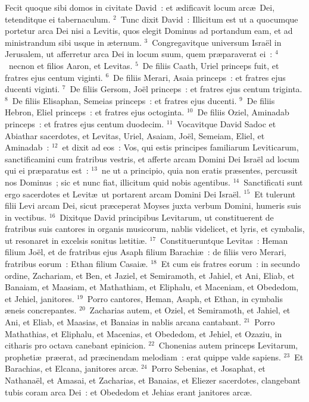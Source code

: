 \bchapter
\lettrine[lines=3,image=true,loversize=0.05,lraise=-0.03]{F}{}ecit quoque sibi domos in civitate David~: et \ae dificavit locum arc\ae\ Dei, tetenditque ei tabernaculum.
${}^{2}$~Tunc dixit David~: Illicitum est ut a quocumque portetur arca Dei nisi a Levitis, quos elegit Dominus ad portandum eam, et ad ministrandum sibi usque in \ae ternum.
${}^{3}$~Congregavitque universum Isra\"el in Jerusalem, ut afferretur arca Dei in locum suum, quem pr\ae paraverat ei~:
${}^{4}$~necnon et filios Aaron, et Levitas.
${}^{5}$~De filiis Caath, Uriel princeps fuit, et fratres ejus centum viginti.
${}^{6}$~De filiis Merari, Asaia princeps~: et fratres ejus ducenti viginti.
${}^{7}$~De filiis Gersom, Jo\"el princeps~: et fratres ejus centum triginta.
${}^{8}$~De filiis Elisaphan, Semeias princeps~: et fratres ejus ducenti.
${}^{9}$~De filiis Hebron, Eliel princeps~: et fratres ejus octoginta.
${}^{10}$~De filiis Oziel, Aminadab princeps~: et fratres ejus centum duodecim.
${}^{11}$~Vocavitque David Sadoc et Abiathar sacerdotes, et Levitas, Uriel, Asaiam, Jo\"el, Semeiam, Eliel, et Aminadab~:
${}^{12}$~et dixit ad eos~: Vos, qui estis principes familiarum Leviticarum, sanctificamini cum fratribus vestris, et afferte arcam Domini Dei Isra\"el ad locum qui ei pr\ae paratus est~:
${}^{13}$~ne ut a principio, quia non eratis pr\ae sentes, percussit nos Dominus~; sic et nunc fiat, illicitum quid nobis agentibus.
${}^{14}$~Sanctificati sunt ergo sacerdotes et Levit\ae\ ut portarent arcam Domini Dei Isra\"el.
${}^{15}$~Et tulerunt filii Levi arcam Dei, sicut pr\ae ceperat Moyses juxta verbum Domini, humeris suis in vectibus.
${}^{16}$~Dixitque David principibus Levitarum, ut constituerent de fratribus suis cantores in organis musicorum, nablis videlicet, et lyris, et cymbalis, ut resonaret in excelsis sonitus l\ae titi\ae .
${}^{17}$~Constitueruntque Levitas~: Heman filium Jo\"el, et de fratribus ejus Asaph filium Barachi\ae~: de filiis vero Merari, fratribus eorum~: Ethan filium Casai\ae .
${}^{18}$~Et cum eis fratres eorum~: in secundo ordine, Zachariam, et Ben, et Jaziel, et Semiramoth, et Jahiel, et Ani, Eliab, et Banaiam, et Maasiam, et Mathathiam, et Eliphalu, et Maceniam, et Obededom, et Jehiel, janitores.
${}^{19}$~Porro cantores, Heman, Asaph, et Ethan, in cymbalis \ae neis concrepantes.
${}^{20}$~Zacharias autem, et Oziel, et Semiramoth, et Jahiel, et Ani, et Eliab, et Maasias, et Banaias in nablis arcana cantabant.
${}^{21}$~Porro Mathathias, et Eliphalu, et Macenias, et Obededom, et Jehiel, et Ozaziu, in citharis pro octava canebant epinicion.
${}^{22}$~Chonenias autem princeps Levitarum, propheti\ae\ pr\ae erat, ad pr\ae cinendam melodiam~: erat quippe valde sapiens.
${}^{23}$~Et Barachias, et Elcana, janitores arc\ae .
${}^{24}$~Porro Sebenias, et Josaphat, et Nathana\"el, et Amasai, et Zacharias, et Banaias, et Eliezer sacerdotes, clangebant tubis coram arca Dei~: et Obededom et Jehias erant janitores arc\ae .


